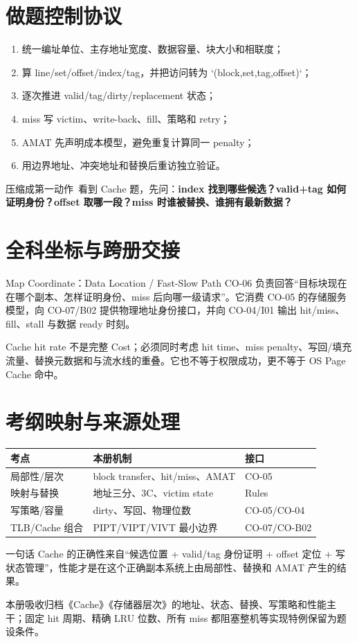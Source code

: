 \documentclass[UTF8,fontset=fandol,11pt,a4paper]{ctexart}
\newcommand{\kw}[1]{\textbf{\color{deep}#1}}\newcommand{\code}[1]{\texttt{#1}}
\begin{document}
\section{做题控制协议}
\begin{enumerate}
\item 统一编址单位、主存地址宽度、数据容量、块大小和相联度；
\item 算 line/set/offset/index/tag，并把访问转为 `(block,set,tag,offset)`；
\item 逐次推进 valid/tag/dirty/replacement 状态；
\item miss 写 victim、write-back、fill、策略和 retry；
\item AMAT 先声明成本模型，避免重复计算同一 penalty；
\item 用边界地址、冲突地址和替换后重访独立验证。
\end{enumerate}
\begin{methodbox}{压缩成第一动作}\
看到 Cache 题，先问：\kw{index 找到哪些候选？valid+tag 如何证明身份？offset 取哪一段？miss 时谁被替换、谁拥有最新数据？}
\end{methodbox}

\section{全科坐标与跨册交接}
\begin{corebox}{Map Coordinate：Data Location / Fast-Slow Path}
CO-06 负责回答“目标块现在在哪个副本、怎样证明身份、miss 后向哪一级请求”。它消费 CO-05 的存储服务模型，向 CO-07/B02 提供物理地址身份接口，并向 CO-04/I01 输出 hit/miss、fill、stall 与数据 ready 时刻。
\end{corebox}
Cache hit rate 不是完整 Cost；必须同时考虑 hit time、miss penalty、写回/填充流量、替换元数据和与流水线的重叠。它也不等于权限成功，更不等于 OS Page Cache 命中。

\section{考纲映射与来源处理}
\begin{center}\small\begin{tabularx}{\linewidth}{L{3.1cm}YY}\toprule
考点 & 本册机制 & 接口\\\midrule
局部性/层次 & block transfer、hit/miss、AMAT & CO-05\\
映射与替换 & 地址三分、3C、victim state & Rules\\
写策略/容量 & dirty、写回、物理位数 & CO-05/CO-04\\
TLB/Cache 组合 & PIPT/VIPT/VIVT 最小边界 & CO-07/CO-B02\\
\bottomrule\end{tabularx}\end{center}
\begin{corebox}{一句话}
Cache 的正确性来自“候选位置 + valid/tag 身份证明 + offset 定位 + 写状态管理”，性能才是在这个正确副本系统上由局部性、替换和 AMAT 产生的结果。\end{corebox}
本册吸收归档《Cache》《存储器层次》的地址、状态、替换、写策略和性能主干；固定 hit 周期、精确 LRU 位数、所有 miss 都阻塞整机等实现特例保留为题设条件。
\end{document}
